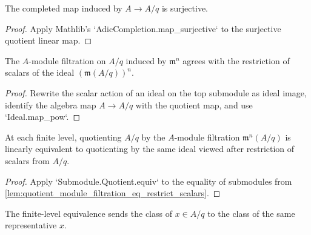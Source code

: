 \begin{lemma}
  \label{lem:quotient_completion_map_surjective}
  The completed map induced by \(A\to A/q\) is surjective.
\end{lemma}

\begin{proof}
  Apply Mathlib's `AdicCompletion.map_surjective` to the surjective quotient
  linear map.
\end{proof}

\begin{lemma}
  \label{lem:quotient_module_filtration_eq_restrict_scalars}
  The \(A\)-module filtration on \(A/q\) induced by \(\mathfrak m^n\) agrees
  with the restriction of scalars of the ideal
  \((\mathfrak m(A/q))^n\).
\end{lemma}

\begin{proof}
  Rewrite the scalar action of an ideal on the top submodule as ideal image,
  identify the algebra map \(A\to A/q\) with the quotient map, and use
  `Ideal.map_pow`.
\end{proof}

\begin{definition}
  \label{def:quotient_module_level_equiv}
  At each finite level, quotienting \(A/q\) by the \(A\)-module filtration
  \(\mathfrak m^n(A/q)\) is linearly equivalent to quotienting by the same
  ideal viewed after restriction of scalars from \(A/q\).
\end{definition}

\begin{proof}
  Apply `Submodule.Quotient.equiv` to the equality of submodules from
  \cref{lem:quotient_module_filtration_eq_restrict_scalars}.
\end{proof}

\begin{lemma}
  \label{lem:quotient_module_level_equiv_mk}
  The finite-level equivalence sends the class of \(x\in A/q\) to the class of
  the same representative \(x\).
\end{lemma}

